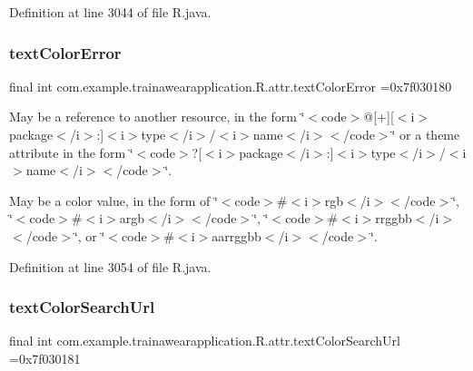 Definition at line 3044 of file R.\+java.

\mbox{\label{classcom_1_1example_1_1trainawearapplication_1_1_r_1_1attr_a24b1ff1d1704c18bb112244e16d1278a}} 
\subsubsection{\texorpdfstring{textColorError}{textColorError}}
{\footnotesize\ttfamily final int com.\+example.\+trainawearapplication.\+R.\+attr.\+text\+Color\+Error =0x7f030180\hspace{0.3cm}{\ttfamily [static]}}

May be a reference to another resource, in the form \char`\"{}$<$code$>$@\mbox{[}+\mbox{]}\mbox{[}$<$i$>$package$<$/i$>$\+:\mbox{]}$<$i$>$type$<$/i$>$/$<$i$>$name$<$/i$>$$<$/code$>$\char`\"{} or a theme attribute in the form \char`\"{}$<$code$>$?\mbox{[}$<$i$>$package$<$/i$>$\+:\mbox{]}$<$i$>$type$<$/i$>$/$<$i$>$name$<$/i$>$$<$/code$>$\char`\"{}. 

May be a color value, in the form of \char`\"{}$<$code$>$\#$<$i$>$rgb$<$/i$>$$<$/code$>$\char`\"{}, \char`\"{}$<$code$>$\#$<$i$>$argb$<$/i$>$$<$/code$>$\char`\"{}, \char`\"{}$<$code$>$\#$<$i$>$rrggbb$<$/i$>$$<$/code$>$\char`\"{}, or \char`\"{}$<$code$>$\#$<$i$>$aarrggbb$<$/i$>$$<$/code$>$\char`\"{}. 

Definition at line 3054 of file R.\+java.

\mbox{\label{classcom_1_1example_1_1trainawearapplication_1_1_r_1_1attr_a8902d087f22c961e9f6ce685b79fd546}} 
\subsubsection{\texorpdfstring{textColorSearchUrl}{textColorSearchUrl}}
{\footnotesize\ttfamily final int com.\+example.\+trainawearapplication.\+R.\+attr.\+text\+Color\+Search\+Url =0x7f030181\hspace{0.3cm}{\ttfamily [static]}}

